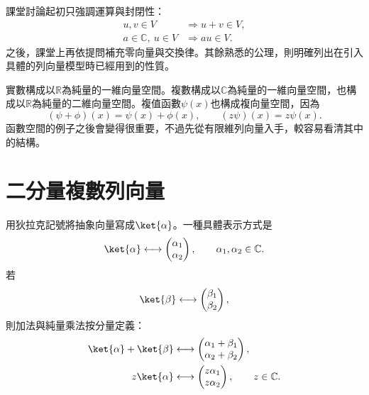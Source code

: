 課堂討論起初只強調運算與封閉性：
\begin{equation}
\begin{aligned}
  u,v\in V&\Longrightarrow u+v\in V,\\
  a\in\mathbb C,\ u\in V&\Longrightarrow au\in V.
\end{aligned}
\end{equation}
之後，課堂上再依提問補充零向量與交換律。其餘熟悉的公理，則明確列出在引入具體的列向量模型時已經用到的性質。

實數構成以\(\mathbb R\)為純量的一維向量空間。複數構成以\(\mathbb C\)為純量的一維向量空間，也構成以\(\mathbb R\)為純量的二維向量空間。複值函數\(\psi(x)\)也構成複向量空間，因為
\begin{equation}
  (\psi+\phi)(x)=\psi(x)+\phi(x),
  \qquad
  (z\psi)(x)=z\psi(x).
\end{equation}
函數空間的例子之後會變得很重要，不過先從有限維列向量入手，較容易看清其中的結構。

\begin{classroomqa}
\end{classroomqa}

\section{二分量複數列向量}

用狄拉克記號將抽象向量寫成\(\ket{\alpha}\)。一種具體表示方式是
\begin{equation}
  \ket{\alpha}
  \longleftrightarrow
  \begin{pmatrix}
    \alpha_1\\
    \alpha_2
  \end{pmatrix},
  \qquad
  \alpha_1,\alpha_2\in\mathbb C.
\end{equation}
若
\begin{equation}
  \ket{\beta}
  \longleftrightarrow
  \begin{pmatrix}
    \beta_1\\
    \beta_2
  \end{pmatrix},
\end{equation}
則加法與純量乘法按分量定義：
\begin{align}
  \ket{\alpha}+\ket{\beta}
  &\longleftrightarrow
  \begin{pmatrix}
    \alpha_1+\beta_1\\
    \alpha_2+\beta_2
  \end{pmatrix},\\
  z\ket{\alpha}
  &\longleftrightarrow
  \begin{pmatrix}
    z\alpha_1\\
    z\alpha_2
  \end{pmatrix},
  \qquad z\in\mathbb C.
\end{align}

